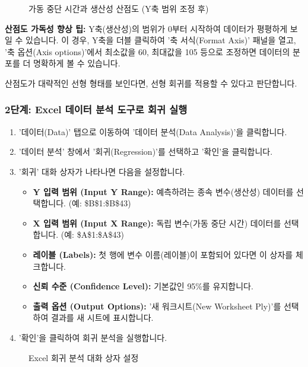 \documentclass[11pt,a4paper]{article}
\theoremstyle{definition}
\begin{document}
\begin{figure}[h!]
    \centering
    \caption{가동 중단 시간과 생산성 산점도 (Y축 범위 조정 후)}
    \label{fig:downtime_scatter_formatted}
\end{figure}
\begin{infobox}
\textbf{산점도 가독성 향상 팁:}
Y축(생산성)의 범위가 0부터 시작하여 데이터가 평평하게 보일 수 있습니다. 이 경우, Y축을 더블 클릭하여 '축 서식(Format Axis)' 패널을 열고, '축 옵션(Axis options)'에서 최소값을 60, 최대값을 105 등으로 조정하면 데이터의 분포를 더 명확하게 볼 수 있습니다.
\end{infobox}
산점도가 대략적인 선형 형태를 보인다면, 선형 회귀를 적용할 수 있다고 판단합니다.

\subsubsection{2단계: Excel 데이터 분석 도구로 회귀 실행}
\begin{enumerate}
    \item '데이터(Data)' 탭으로 이동하여 '데이터 분석(Data Analysis)'을 클릭합니다.
    \item '데이터 분석' 창에서 '회귀(Regression)'를 선택하고 '확인'을 클릭합니다.
    \item '회귀' 대화 상자가 나타나면 다음을 설정합니다.
    \begin{itemize}
        \item \textbf{Y 입력 범위 (Input Y Range):} 예측하려는 종속 변수(생산성) 데이터를 선택합니다. (예: \$B\$1:\$B\$43)
        \item \textbf{X 입력 범위 (Input X Range):} 독립 변수(가동 중단 시간) 데이터를 선택합니다. (예: \$A\$1:\$A\$43)
        \item \textbf{레이블 (Labels):} 첫 행에 변수 이름(레이블)이 포함되어 있다면 이 상자를 체크합니다.
        \item \textbf{신뢰 수준 (Confidence Level):} 기본값인 95\%를 유지합니다.
        \item \textbf{출력 옵션 (Output Options):} '새 워크시트(New Worksheet Ply)'를 선택하여 결과를 새 시트에 표시합니다.
    \end{itemize}
    \item '확인'을 클릭하여 회귀 분석을 실행합니다.
\end{enumerate}

\begin{figure}[h!]
    \centering
    \caption{Excel 회귀 분석 대화 상자 설정}
    \label{fig:excel_regression_dialog}
\end{figure}
\end{document}
